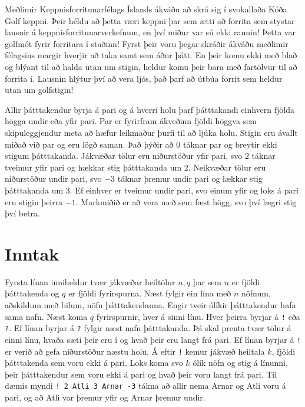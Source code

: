 
Meðlimir Keppnisforritunarfélags Íslands ákváðu að skrá sig í svokallaða Kóða Golf keppni.
Þeir héldu að þetta væri keppni þar sem ætti að forrita sem stystar lausnir á keppnisforritunarverkefnum,
en því miður var sú ekki raunin!
Þetta var golfmót fyrir forritara í staðinn!
Fyrst þeir voru þegar skráðir ákváðu meðlimir félagsins margir hverjir að taka samt sem áður þátt.
En þeir komu ekki með blað og blýant til að halda utan um stigin,
heldur komu þeir bara með fartölvur til að forrita í.
Lausnin hlýtur því að vera ljós, það þarf að útbúa forrit sem heldur utan um golfstigin!

Allir þátttakendur byrja á pari og á hverri holu þarf þátttakandi einhvern fjölda högga undir eða yfir pari.
Par er fyrirfram ákveðinn fjöldi höggva sem skipuleggjendur meta að hæfur leikmaður þurfi til að ljúka holu.
Stigin eru ávallt miðað við par og eru lögð saman.
Það þýðir að $0$ táknar par og breytir ekki stigum þátttakanda.
Jákvæðar tölur eru niðurstöður yfir pari, svo $2$ táknar tveimur yfir pari og hækkar stig þátttakanda um $2$.
Neikvæðar tölur eru niðurstöður undir pari, svo $-3$ táknar þremur undir pari og lækkar stig þátttakanda um $3$.
Ef einhver er tveimur undir pari, svo einum yfir og loks á pari eru stigin þeirra $-1$.
Markmiðið er að vera með sem fæst högg, svo því lægri stig því betra.

\section*{Inntak}
Fyrsta línan inniheldur tvær jákvæðar heiltölur $n, q$ þar sem $n$ er fjöldi þátttakenda og $q$
er fjöldi fyrirspurna.
Næst fylgir ein lína með $n$ nöfnum, aðskildum með bilum, nöfn þátttakendanna. 
Engir tveir ólíkir þátttakendur hafa sama nafn.
Næst koma $q$ fyrirspurnir, hver á sinni línu.
Hver þeirra byrjar á \texttt{!} eða \texttt{?}. 
Ef línan byrjar á \texttt{?} fylgir næst nafn þátttakanda.
Þá skal prenta tvær tölur á einni línu,
hvaða sæti þeir eru í og hvað þeir eru langt frá pari.
Ef línan byrjar á \texttt{!} er verið að gefa niðurstöður næstu holu.
Á eftir \texttt{!} kemur jákvæð heiltala $k$, fjöldi þátttakenda sem voru ekki á pari.
Loks koma svo $k$ ólík nöfn og stig á línunni,
þeir þátttakendur sem voru ekki á pari og hvað þeir voru langt frá pari.
Til dæmis myndi \texttt{! 2 Atli 3 Arnar -3} tákna að allir nema Arnar og Atli voru á pari,
og að Atli var þremur yfir og Arnar þremur undir.

